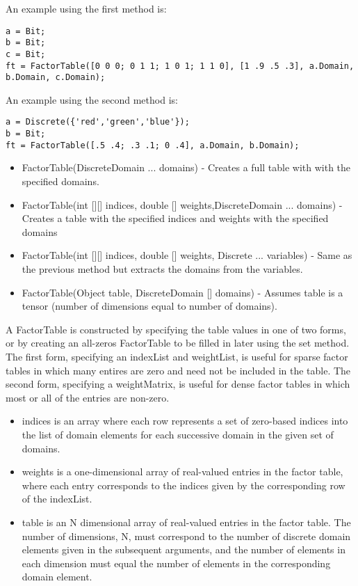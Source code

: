 An example using the first method is:
\begin{lstlisting}
a = Bit;
b = Bit;
c = Bit;
ft = FactorTable([0 0 0; 0 1 1; 1 0 1; 1 1 0], [1 .9 .5 .3], a.Domain, b.Domain, c.Domain);
\end{lstlisting}

An example using the second method is:
\begin{lstlisting}
a = Discrete({'red','green','blue'});
b = Bit;
ft = FactorTable([.5 .4; .3 .1; 0 .4], a.Domain, b.Domain);
\end{lstlisting}

\fi

\ifjava

\begin{itemize}
\item FactorTable(DiscreteDomain ... domains) - Creates a full table with with the specified domains.
\item FactorTable(int [][] indices, double [] weights,DiscreteDomain ... domains) - Creates a table with the specified indices and weights with the specified domains
\item FactorTable(int [][] indices, double [] weights, Discrete ... variables) - Same as the previous method but extracts the domains from the variables.
\item FactorTable(Object table, DiscreteDomain [] domains) - Assumes table is a tensor (number of dimensions equal to number of domains).  
\end{itemize}

A FactorTable is constructed by specifying the table values in one of two forms, or by creating an all-zeros FactorTable to be filled in later using the set method.  The first form, specifying an indexList and weightList, is useful for sparse factor tables in which many entires are zero and need not be included in the table.  The second form, specifying a weightMatrix, is useful for dense factor tables in which most or all of the entries are non-zero.

\begin{itemize}
\item indices is an array where each row represents a set of zero-based indices into the list of domain elements for each successive domain in the given set of domains.
\item weights is a one-dimensional array of real-valued entries in the factor table, where each entry corresponds to the indices given by the corresponding row of the indexList.
\item table is an N dimensional array of real-valued entries in the factor table.  The number of dimensions, N, must correspond to the number of discrete domain elements given in the subsequent arguments, and the number of elements in each dimension must equal the number of elements in the corresponding domain element.
\end{itemize}

